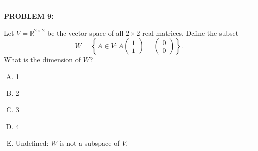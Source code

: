 \documentclass[12pt]{amsart}
\newcommand{\divider}{
  \vspace{-1em} %
  \noindent
  \raisebox{-0.15ex}{\textbullet}%
  \hspace{0.5em}%
  \rule[0.5ex]{0.95\textwidth}{1.0pt}%
  \hspace{0.5em}%
  \raisebox{-0.15ex}{\textbullet}%
  \vspace{0em} %
}
\begin{document}

\divider

{\bf PROBLEM 9:}

Let $V = \mathbb{R}^{2 \times 2}$ be the vector space of all $2 \times 2$ real matrices. Define the subset 
$$W = \left\{ A \in V : A \begin{pmatrix} 1 \\ 1 \end{pmatrix} = \begin{pmatrix} 0 \\ 0 \end{pmatrix} \right\}.$$
What is the dimension of $W$?

\begin{enumerate}[(A)]
\item 1
\item 2
\item 3
\item 4
\item Undefined: $W$ is not a subspace of $V$.
\end{enumerate}
\end{document}
